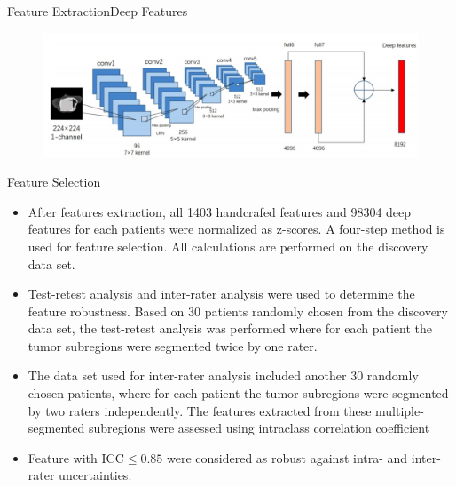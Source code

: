 \documentclass[
]{beamer}
\begin{document}
	\begin{frame}{Feature Extraction}{Deep Features}
		\begin{figure}
			\includegraphics[scale=0.4]{cnn1}
		\end{figure}
	\end{frame}
	
	
	\begin{frame}{Feature Selection}
		\begin{itemize}
			\item After features extraction, all 1403 handcrafed features and 98304 deep features for each
			patients were normalized as z-scores. A four-step method is used for feature selection. All calculations are performed on the
			discovery data set.
			\item Test-retest analysis and inter-rater analysis were used to determine the feature robustness. Based on 30 patients
			randomly chosen from the discovery data set, the test-retest analysis was performed where for each patient the
			tumor subregions were segmented twice by one rater.
			\item The data set used for inter-rater analysis included
			another 30 randomly chosen patients, where for each patient the tumor subregions were segmented by two raters
			independently. The features extracted from these multiple-segmented subregions were assessed using intraclass
			correlation coefficient 
			\item  Feature with ICC$\leq0.85$ were considered as robust against intra- and inter-rater
			uncertainties.
		\end{itemize}
	\end{frame}
	
\end{document}
